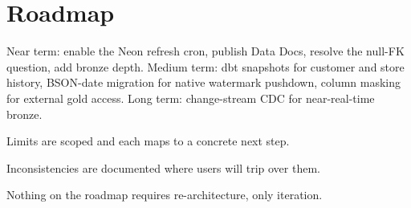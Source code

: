 \section{Roadmap}

Near term: enable the Neon refresh cron, publish Data Docs, resolve the null-FK question, add bronze  depth. Medium term: dbt snapshots for customer and store history, BSON-date migration for native watermark pushdown, column masking for external gold access. Long term: change-stream CDC for near-real-time bronze.

\begin{keybox}
\item Limits are scoped and each maps to a concrete next step.
\item Inconsistencies are documented where users will trip over them.
\item Nothing on the roadmap requires re-architecture, only iteration.
\end{keybox}
